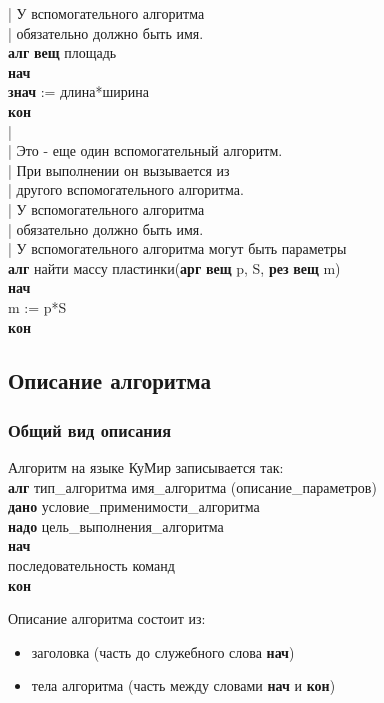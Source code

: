 {| У вспомогательного алгоритма \\
|   обязательно должно быть имя.\\
\textbf{алг} \textbf{вещ} площадь\\
\textbf{нач}\\
\otstup \textbf{знач} := длина*ширина\\
\textbf{кон}\\
|\\
| Это - еще один вспомогательный алгоритм.\\
| При выполнении он вызывается из \\
|    другого вспомогательного алгоритма.\\
| У вспомогательного алгоритма \\
|   обязательно должно быть имя.\\
| У вспомогательного алгоритма могут быть параметры \\
\textbf{алг} найти массу пластинки(\textbf{арг} \textbf{вещ} p, S, \textbf{рез} \textbf{вещ} m) \\
\textbf{нач}\\
\otstup m := p*S\\
\textbf{кон}
}\normalsize

\subsection{Описание алгоритма}
\label{algorithm}

\subsubsection{Общий вид описания}

Алгоритм на языке КуМир записывается так:
{\sffamily~\\
\textbf{алг} тип\_алгоритма имя\_алгоритма (описание\_параметров)\\
\otstup \textbf{дано} условие\_применимости\_алгоритма\\
\otstup \textbf{надо} цель\_выполнения\_алгоритма\\
\textbf{нач}\\
\otstup последовательность команд\\
\textbf{кон}\\
}
	
	Описание алгоритма состоит из:
\begin{itemize}
\item заголовка (часть до служебного слова \textbf{нач})
\item тела алгоритма (часть между словами \textbf{нач} и \textbf{кон})
\end{itemize}

